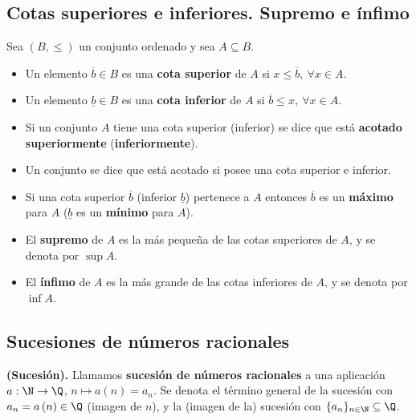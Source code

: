 \subsection{Cotas superiores e inferiores. Supremo e ínfimo}
\begin{definition}
    Sea $\left( B, \leq \right) $ un conjunto ordenado y sea $A\subseteq B$.
    \begin{itemize}
        \item Un elemento $\overline{b}\in B$ es una \textbf{cota superior} de $A$ si $x\leq\overline{b},\ \forall x\in A$.
        \item Un elemento $\underline{b}\in B$ es una \textbf{cota inferior} de $A$ si $\overline{b}\leq x,\ \forall x\in A$.
        \item Si un conjunto $A$ tiene una cota superior (inferior) se dice que está \textbf{acotado superiormente} (\textbf{inferiormente}).
        \item Un conjunto se dice que está acotado si posee una cota superior e inferior.
        \item Si una cota superior $\overline{b}$ (inferior $\underline{b}$) pertenece a $A$ entonces $\overline{b}$ es un \textbf{máximo} para $A$ ($\underline{b}$ es un \textbf{mínimo} para $A$).
        \item El \textbf{supremo} de $A$ es la más pequeña de las cotas superiores de $A$, y se denota por $\sup A$.
        \item El \textbf{ínfimo} de $A$ es la más grande de las cotas inferiores de $A$, y se denota por $\inf A$.
    \end{itemize}
\end{definition}

\subsection{Sucesiones de números racionales}
\begin{definition}
    \textbf{(Sucesión).} Llamamos \textbf{sucesión de números racionales} a una aplicación $a:\N\to\Q$, $n\mapsto a\left( n \right) = a_n$. Se denota el término general de la sucesión con $a_n = a\left( n \right) \in\Q$ (imagen de $n$), y la (imagen de la) sucesión con $\{a_n\}_{n\in\N}\subseteq\Q$.
\end{definition}

